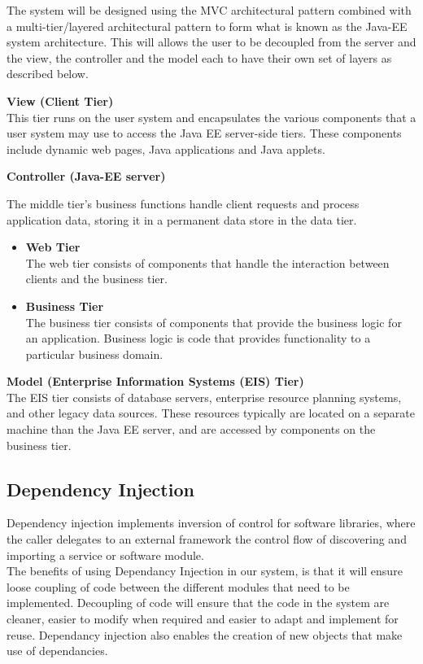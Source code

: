 \begin{flushleft}
The system will be designed using the MVC architectural pattern combined
with a multi-tier/layered architectural pattern to form what is known as the Java-EE system architecture.
This will allows the user to be decoupled from the server and the view, the controller and the model each 
to have their own set of layers as described below.

\textbf{View (Client Tier)}\\
This tier runs on the user system and encapsulates the various components that a user system may use to access the Java EE server-side tiers. These components include dynamic web pages, Java applications and Java applets. 

\textbf{Controller (Java-EE server)}

The middle tier's business functions handle client requests and process application data, storing it in a permanent data store in the data tier.

\begin{itemize}
	\item \textbf{Web Tier}
	\\The web tier consists of components that handle the interaction between clients and the business tier.
	
	\item \textbf{Business Tier}
	\\The business tier consists of components that provide the business logic for an application. Business logic is code that provides functionality to a particular business domain.
\end{itemize}

\textbf{Model (Enterprise Information Systems (EIS) Tier)}\\
The EIS tier consists of database servers, enterprise resource planning systems, and other legacy data sources. These resources typically are located on a separate machine than the Java EE server, and are accessed by components on the business tier.

\end{flushleft}

\subsection*{Dependency Injection}

\begin{flushleft}

Dependency injection implements inversion of control for software libraries, where the caller delegates to an external framework the control flow of discovering and importing a service or software module.\\
The benefits of using Dependancy Injection in our system, is that it will ensure loose coupling of code between the different modules that need to be implemented. Decoupling of code will ensure that the code in the system are cleaner, easier to modify when required and easier to adapt and implement for reuse. Dependancy injection also enables the creation of new objects that make use of dependancies.
\end{flushleft}


